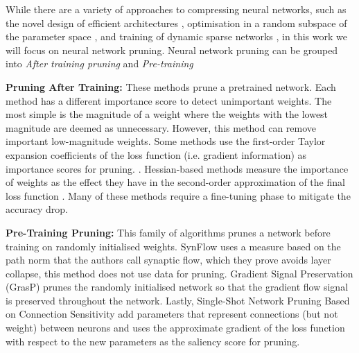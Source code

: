 While there are a variety of approaches to compressing neural networks, such
as the novel design of efficient architectures
\cite{tanEfficientNetRethinkingModel2019,
howardMobileNetsEfficientConvolutional2017,
sandlerMobileNetV2InvertedResiduals2019}, optimisation in a random subspace of
the
parameter space \cite{liMeasuringIntrinsicDimension2022}, and training of dynamic sparse networks 
\cite{mocanuScalableTrainingArtificial2018a,bellecDeepRewiringTraining2018,
evciRiggingLotteryMaking2020,dettmersSparseNetworksScratch2019} , in this work we will focus on neural network pruning.
Neural network pruning can be grouped into \textit{After training pruning}
and \textit{Pre-training } 

\textbf{Pruning After Training:} These methods prune a pretrained network.
Each method has a different importance score to detect unimportant weights.
The most simple is the magnitude of a weight
\cite{hanLearningBothWeights2015a,hanDeepCompressionCompressing2016a} where the
weights with the lowest magnitude are deemed as
 unnecessary. However, this method can remove important low-magnitude weights.
 Some methods use the first-order Taylor expansion coefficients of the loss function (i.e. gradient information) as importance scores for pruning. \cite{karninsimpleprocedurepruning1990a,mozerSkeletonizationTechniqueTrimming1988}.
 Hessian-based methods measure the importance of weights as the effect they
 have in the second-order approximation of the final loss function 
 \cite{hassibiSecondOrderDerivatives1992,lecunOptimalBrainDamage1989,
 hassibiOptimalBrainSurgeon1993,singhWoodFisherEfficientSecondOrder2020}.
 Many of these methods require a fine-tuning phase to mitigate the accuracy
 drop.




\textbf{Pre-Training Pruning:} This family of algorithms prunes a
network before training on randomly initialised weights. SynFlow
\cite{tanakaPruningNeuralNetworks2020a} uses a measure based on the path norm
\cite{neyshaburPathSGDPathNormalizedOptimization2015} that the authors call
synaptic flow, which they prove avoids layer collapse, this method does not use
data for pruning. Gradient Signal Preservation
(GrasP) \cite{wangPickingWinningTickets2020} prunes the randomly initialised network so that the
gradient flow signal is preserved throughout the network.
Lastly, Single-Shot Network Pruning Based on Connection Sensitivity
\cite{leeSNIPSINGLESHOTNETWORK2018} add parameters that represent
connections (but not weight) between neurons and uses the approximate
gradient of the loss function with respect to the new parameters as the
saliency score for pruning. 

